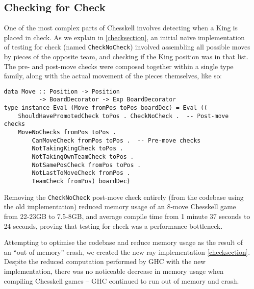 \documentclass[12pt, a4paper, bibliography=totocnumbered]{scrreprt}
\newcommand{\inline}[1]{\lstinline[basicstyle=\ttfamily\footnotesize]{#1}}
\begin{document}
\subsection{Checking for Check}

One of the most complex parts of Chesskell involves detecting when a King is placed in check. As we explain in \cref{checksection}, an initial na\"ive implementation of testing for check (named \inline{CheckNoCheck}) involved assembling all possible moves by pieces of the opposite team, and checking if the King position was in that list. The pre- and post-move checks were composed together within a single type family, along with the actual movement of the pieces themselves, like so:
\begin{lstlisting}
data Move :: Position -> Position
          -> BoardDecorator -> Exp BoardDecorator
type instance Eval (Move fromPos toPos boardDec) = Eval ((
    ShouldHavePromotedCheck toPos . CheckNoCheck .  -- Post-move checks
    MoveNoChecks fromPos toPos .
        CanMoveCheck fromPos toPos .  -- Pre-move checks
        NotTakingKingCheck toPos .
        NotTakingOwnTeamCheck toPos .
        NotSamePosCheck fromPos toPos .
        NotLastToMoveCheck fromPos .
        TeamCheck fromPos) boardDec)
\end{lstlisting}
Removing the \inline{CheckNoCheck} post-move check entirely (from the codebase using the old implementation) reduced memory usage of an 8-move Chesskell game from 22-23GB to 7.5-8GB, and average compile time from 1 minute 37 seconds to 24 seconds, proving that testing for check was a performance bottleneck.

Attempting to optimise the codebase and reduce memory usage as the result of an ``out of memory'' crash, we created the new ray implementation \cref{checksection}. Despite the reduced computation performed by GHC with the new implementation, there was no noticeable decrease in memory usage when compiling Chesskell games -- GHC continued to run out of memory and crash.
\end{document}
